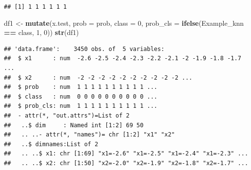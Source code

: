 \documentclass[
]{krantz}
\newenvironment{Shaded}{\begin{snugshade}}{\end{snugshade}}
\newcommand{\DataTypeTok}[1]{\textcolor[rgb]{0.13,0.29,0.53}{#1}}
\newcommand{\DecValTok}[1]{\textcolor[rgb]{0.00,0.00,0.81}{#1}}
\newcommand{\KeywordTok}[1]{\textcolor[rgb]{0.13,0.29,0.53}{\textbf{#1}}}
\newcommand{\NormalTok}[1]{#1}
\newcommand{\OperatorTok}[1]{\textcolor[rgb]{0.81,0.36,0.00}{\textbf{#1}}}
\newcommand{\StringTok}[1]{\textcolor[rgb]{0.31,0.60,0.02}{#1}}
\begin{document}
\begin{verbatim}
## [1] 1 1 1 1 1 1
\end{verbatim}

\begin{Shaded}
\begin{Highlighting}[]
\NormalTok{df1 \textless{}{-}}\StringTok{ }\KeywordTok{mutate}\NormalTok{(x.test, }\DataTypeTok{prob =}\NormalTok{ prob, }\DataTypeTok{class =} \DecValTok{0}\NormalTok{,  }
          \DataTypeTok{prob\_cls =} \KeywordTok{ifelse}\NormalTok{(Example\_knn }\OperatorTok{==}\StringTok{ }\NormalTok{class, }\DecValTok{1}\NormalTok{, }\DecValTok{0}\NormalTok{))}
\KeywordTok{str}\NormalTok{(df1)}
\end{Highlighting}
\end{Shaded}

\begin{verbatim}
## 'data.frame':    3450 obs. of  5 variables:
##  $ x1      : num  -2.6 -2.5 -2.4 -2.3 -2.2 -2.1 -2 -1.9 -1.8 -1.7 ...
##  $ x2      : num  -2 -2 -2 -2 -2 -2 -2 -2 -2 -2 ...
##  $ prob    : num  1 1 1 1 1 1 1 1 1 1 ...
##  $ class   : num  0 0 0 0 0 0 0 0 0 0 ...
##  $ prob_cls: num  1 1 1 1 1 1 1 1 1 1 ...
##  - attr(*, "out.attrs")=List of 2
##   ..$ dim     : Named int [1:2] 69 50
##   .. ..- attr(*, "names")= chr [1:2] "x1" "x2"
##   ..$ dimnames:List of 2
##   .. ..$ x1: chr [1:69] "x1=-2.6" "x1=-2.5" "x1=-2.4" "x1=-2.3" ...
##   .. ..$ x2: chr [1:50] "x2=-2.0" "x2=-1.9" "x2=-1.8" "x2=-1.7" ...
\end{verbatim}
\end{document}
